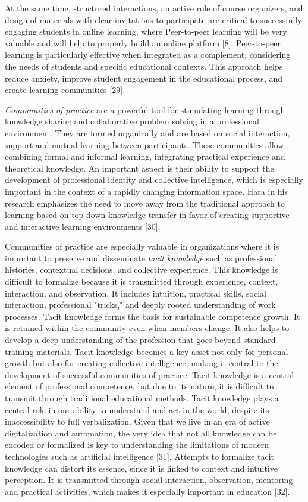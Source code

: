 At the same time, structured interactions, an active role of course
organizers, and design of materials with clear invitations to
participate are critical to successfully engaging students in online
learning, where Peer-to-peer learning will be very valuable and will
help to properly build an online platform {[}8{]}. Peer-to-peer learning
is particularly effective when integrated as a complement, considering
the needs of students and specific educational contexts. This approach
helps reduce anxiety, improve student engagement in the educational
process, and create learning communities {[}29{]}.

\emph{Communities of practice} are a powerful tool for stimulating
learning through knowledge sharing and collaborative problem solving in
a professional environment. They are formed organically and are based on
social interaction, support and mutual learning between participants.
These communities allow combining formal and informal learning,
integrating practical experience and theoretical knowledge. An important
aspect is their ability to support the development of professional
identity and collective intelligence, which is especially important in
the context of a rapidly changing information space. Hara in his
research emphasizes the need to move away from the traditional approach
to learning based on top-down knowledge transfer in favor of creating
supportive and interactive learning environments {[}30{]}.

Communities of practice are especially valuable in organizations where
it is important to preserve and disseminate \emph{tacit knowledge} such
as professional histories, contextual decisions, and collective
experience. This knowledge is difficult to formalize because it is
transmitted through experience, context, interaction, and observation.
It includes intuition, practical skills, social interaction,
professional "tricks," and deeply rooted understanding of work
processes. Tacit knowledge forms the basis for sustainable competence
growth. It is retained within the community even when members change. It
also helps to develop a deep understanding of the profession that goes
beyond standard training materials. Tacit knowledge becomes a key asset
not only for personal growth but also for creating collective
intelligence, making it central to the development of successful
communities of practice. Tacit knowledge is a central element of
professional competence, but due to its nature, it is difficult to
transmit through traditional educational methods. Tacit knowledge plays
a central role in our ability to understand and act in the world,
despite its inaccessibility to full verbalization. Given that we live in
an era of active digitalization and automation, the very idea that not
all knowledge can be encoded or formalized is key to understanding the
limitations of modern technologies such as artificial intelligence
{[}31{]}. Attempts to formalize tacit knowledge can distort its essence,
since it is linked to context and intuitive perception. It is
transmitted through social interaction, observation, mentoring and
practical activities, which makes it especially important in education
{[}32{]}.

